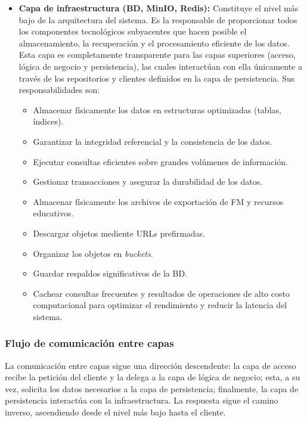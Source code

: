 \begin{itemize}
    \item \textbf{Capa de infraestructura (\ac{BD}, MinIO, Redis):} Constituye el nivel más bajo de la arquitectura del sistema. 
	Es la responsable de proporcionar todos los componentes tecnológicos subyacentes que hacen posible 
	el almacenamiento, la recuperación y el procesamiento eficiente de los datos. Esta capa es 
	completamente transparente para las capas superiores (acceso, lógica de negocio y persistencia), 
	las cuales interactúan con ella únicamente a través de los repositorios y clientes definidos en 
	la capa de persistencia. Sus responsabilidades son:
    \begin{itemize}
        \item Almacenar físicamente los datos en estructuras optimizadas (tablas, índices).
        \item Garantizar la integridad referencial y la consistencia de los datos.
        \item Ejecutar consultas eficientes sobre grandes volúmenes de información.
        \item Gestionar transacciones y asegurar la durabilidad de los datos.
        \item Almacenar físicamente los archivos de exportación de \ac{FM} y recursos educativos.
        \item Descargar objetos mediente \ac{URL}s prefirmadas.
        \item Organizar los objetos en \textit{buckets}.
        \item Guardar respaldos significativos de la \ac{BD}.
        \item Cachear consultas frecuentes y resultados de operaciones de alto costo computacional para optimizar el rendimiento y reducir la latencia del sistema.
    \end{itemize}
\end{itemize}

\subsubsection{Flujo de comunicación entre capas}

La comunicación entre capas sigue una dirección descendente: la capa de acceso recibe la 
petición del cliente y la delega a la capa de lógica de negocio; esta, a su vez, solicita los datos 
necesarios a la capa de persistencia; finalmente, la capa de persistencia interactúa con la 
infraestructura. La respuesta sigue el camino inverso, ascendiendo desde el nivel más bajo hasta el cliente.


